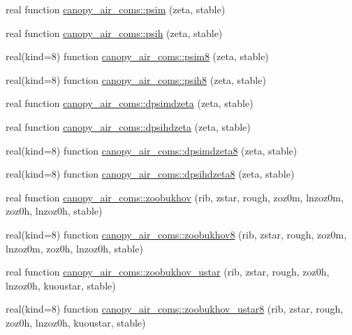 \begin{DoxyCompactItemize}
\item 
real function \hyperlink{namespacecanopy__air__coms_ab103fa081460babbe04c9a5a4699be5f}{canopy\+\_\+air\+\_\+coms\+::psim} (zeta, stable)
\item 
real function \hyperlink{namespacecanopy__air__coms_acedb0f66db4b79009a69e87c5fd3ed71}{canopy\+\_\+air\+\_\+coms\+::psih} (zeta, stable)
\item 
real(kind=8) function \hyperlink{namespacecanopy__air__coms_aba7cbe776dbfa9815870ad3686949041}{canopy\+\_\+air\+\_\+coms\+::psim8} (zeta, stable)
\item 
real(kind=8) function \hyperlink{namespacecanopy__air__coms_aef33f0eeea82151a8edb6dc38c4cc921}{canopy\+\_\+air\+\_\+coms\+::psih8} (zeta, stable)
\item 
real function \hyperlink{namespacecanopy__air__coms_af8bc6f1d6999a4b614461cecb85c9b1b}{canopy\+\_\+air\+\_\+coms\+::dpsimdzeta} (zeta, stable)
\item 
real function \hyperlink{namespacecanopy__air__coms_a64552e0380fcb36366b5eb0f624241a3}{canopy\+\_\+air\+\_\+coms\+::dpsihdzeta} (zeta, stable)
\item 
real(kind=8) function \hyperlink{namespacecanopy__air__coms_a51b006ac118f9549aee23ddb61a1bf19}{canopy\+\_\+air\+\_\+coms\+::dpsimdzeta8} (zeta, stable)
\item 
real(kind=8) function \hyperlink{namespacecanopy__air__coms_aa5f9649efc40a05ddc13e1450f30fad3}{canopy\+\_\+air\+\_\+coms\+::dpsihdzeta8} (zeta, stable)
\item 
real function \hyperlink{namespacecanopy__air__coms_a6062471b3381c283205ea8b27383a5e0}{canopy\+\_\+air\+\_\+coms\+::zoobukhov} (rib, zstar, rough, zoz0m, lnzoz0m, zoz0h, lnzoz0h, stable)
\item 
real(kind=8) function \hyperlink{namespacecanopy__air__coms_afef697305b4b30385c5206f48d9e787c}{canopy\+\_\+air\+\_\+coms\+::zoobukhov8} (rib, zstar, rough, zoz0m, lnzoz0m, zoz0h, lnzoz0h, stable)
\item 
real function \hyperlink{namespacecanopy__air__coms_a5251266695c581c8f4058d98f6c86200}{canopy\+\_\+air\+\_\+coms\+::zoobukhov\+\_\+ustar} (rib, zstar, rough, zoz0h, lnzoz0h, kuoustar, stable)
\item 
real(kind=8) function \hyperlink{namespacecanopy__air__coms_a6ef582f46fded1355973730e6a2289f2}{canopy\+\_\+air\+\_\+coms\+::zoobukhov\+\_\+ustar8} (rib, zstar, rough, zoz0h, lnzoz0h, kuoustar, stable)
\end{DoxyCompactItemize}
